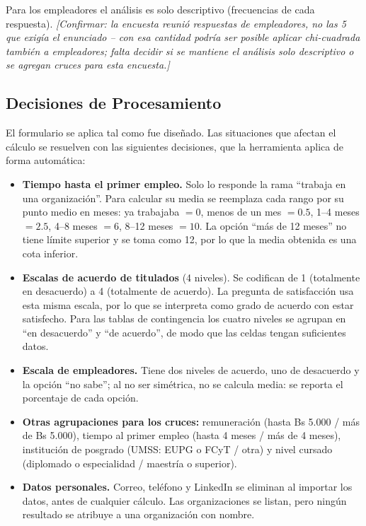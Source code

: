 \documentclass[12pt, a4paper]{article}
\begin{document}
Para los empleadores el análisis es solo descriptivo (frecuencias de
cada respuesta). \textit{[Confirmar: la encuesta reunió \nEmpleadores{} respuestas
de empleadores, no las 5 que exigía el enunciado -- con esa cantidad
podría ser posible aplicar chi-cuadrada también a empleadores; falta
decidir si se mantiene el análisis solo descriptivo o se agregan
cruces para esta encuesta.]}

\subsection{Decisiones de Procesamiento}

El formulario se aplica tal como fue diseñado. Las situaciones que
afectan el cálculo se resuelven con las siguientes decisiones, que la
herramienta aplica de forma automática:

\begin{itemize}
  \item \textbf{Tiempo hasta el primer empleo.} Solo lo responde la rama
  ``trabaja en una organización''. Para calcular su media se reemplaza
  cada rango por su punto medio en meses: ya trabajaba $=0$, menos de un
  mes $=0.5$, 1--4 meses $=2.5$, 4--8 meses $=6$, 8--12 meses $=10$. La
  opción ``más de 12 meses'' no tiene límite superior y se toma como 12,
  por lo que la media obtenida es una cota inferior.
  \item \textbf{Escalas de acuerdo de titulados} (4 niveles). Se
  codifican de 1 (totalmente en desacuerdo) a 4 (totalmente de
  acuerdo). La pregunta de satisfacción usa esta misma escala, por lo
  que se interpreta como grado de acuerdo con estar satisfecho. Para las
  tablas de contingencia los cuatro niveles se agrupan en ``en
  desacuerdo'' y ``de acuerdo'', de modo que las celdas tengan
  suficientes datos.
  \item \textbf{Escala de empleadores.} Tiene dos niveles de acuerdo, uno
  de desacuerdo y la opción ``no sabe''; al no ser simétrica, no se
  calcula media: se reporta el porcentaje de cada opción.
  \item \textbf{Otras agrupaciones para los cruces:} remuneración (hasta
  Bs 5.000 / más de Bs 5.000), tiempo al primer empleo (hasta 4 meses /
  más de 4 meses), institución de posgrado (UMSS: EUPG o FCyT / otra) y
  nivel cursado (diplomado o especialidad / maestría o superior).
  \item \textbf{Datos personales.} Correo, teléfono y LinkedIn se eliminan
  al importar los datos, antes de cualquier cálculo. Las organizaciones
  se listan, pero ningún resultado se atribuye a una organización con
  nombre.
\end{itemize}
\end{document}
